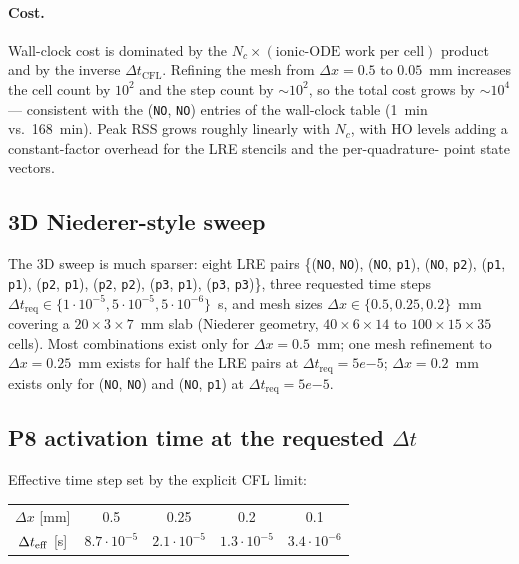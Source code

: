 \documentclass[11pt,a4paper]{article}
\newcommand{\code}[1]{\texttt{\small #1}}
\begin{document}
\paragraph{Cost.}
Wall-clock cost is dominated by the
$N_{c}\times(\text{ionic-ODE work per cell})$ product and by the
inverse $\Delta t_{\text{CFL}}$. Refining the mesh from
$\Delta x = 0.5$ to $0.05$~mm increases the cell count by $10^{2}$ and
the step count by $\sim 10^{2}$, so the total cost grows by
$\sim 10^{4}$ — consistent with the (\code{NO}, \code{NO}) entries
of the wall-clock table (1~min vs.\ 168~min).
Peak RSS grows roughly linearly with $N_{c}$, with HO levels adding a
constant-factor overhead for the LRE stencils and the per-quadrature-
point state vectors.

\subsection{3D Niederer-style sweep}
\label{sec:results:3D}

The 3D sweep is much sparser: eight LRE pairs
\{(\code{NO}, \code{NO}), (\code{NO}, \code{p1}),
(\code{NO}, \code{p2}), (\code{p1}, \code{p1}),
(\code{p2}, \code{p1}), (\code{p2}, \code{p2}),
(\code{p3}, \code{p1}), (\code{p3}, \code{p3})\},
three requested time steps
$\Delta t_{\text{req}} \in
\{1\!\cdot\!10^{-5}, 5\!\cdot\!10^{-5}, 5\!\cdot\!10^{-6}\}$~s,
and mesh sizes $\Delta x \in \{0.5, 0.25, 0.2\}$~mm covering a
$20\times 3\times 7$~mm slab (Niederer geometry, $40\times 6\times 14$
to $100\times 15\times 35$ cells). Most combinations exist only for
$\Delta x = 0.5$~mm; one mesh refinement to $\Delta x = 0.25$~mm
exists for half the LRE pairs at $\Delta t_{\text{req}} = 5e{-5}$;
$\Delta x = 0.2$~mm exists only for (\code{NO}, \code{NO}) and
(\code{NO}, \code{p1}) at $\Delta t_{\text{req}} = 5e{-5}$.

\subsection{P8 activation time at the requested $\Delta t$}

Effective time step set by the explicit CFL limit:
\begin{center}\small
\begin{tabular}{ccccc}\toprule
$\Delta x$ [mm] & 0.5 & 0.25 & 0.2 & 0.1\\
$\Delta t_{\rm eff}$ [s] & $8.7\!\cdot\!10^{-5}$ & $2.1\!\cdot\!10^{-5}$ & $1.3\!\cdot\!10^{-5}$ & $3.4\!\cdot\!10^{-6}$ \\
\bottomrule\end{tabular}\end{center}
\end{document}

